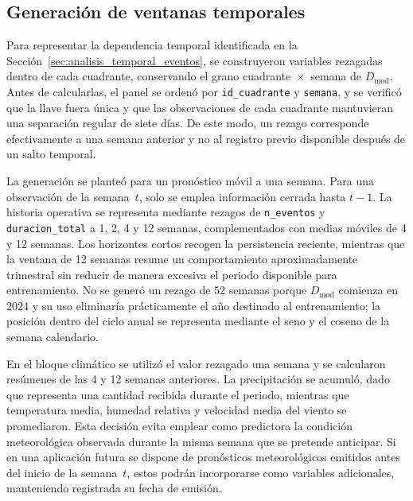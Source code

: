 \subsection{Generación de ventanas temporales}
\label{sec:generacion_ventanas_temporales}

Para representar la dependencia temporal identificada en la Sección~\ref{sec:analisis_temporal_eventos}, se construyeron variables rezagadas dentro de cada cuadrante, conservando el grano cuadrante~$\times$~semana de $D_{\mathrm{mod}}$. Antes de calcularlas, el panel se ordenó por \texttt{id\_cuadrante} y \texttt{semana}, y se verificó que la llave fuera única y que las observaciones de cada cuadrante mantuvieran una separación regular de siete días. De este modo, un rezago corresponde efectivamente a una semana anterior y no al registro previo disponible después de un salto temporal.

La generación se planteó para un pronóstico móvil a una semana. Para una observación de la semana~$t$, solo se emplea información cerrada hasta $t-1$. La historia operativa se representa mediante rezagos de \texttt{n\_eventos} y \texttt{duracion\_total} a 1, 2, 4 y 12 semanas, complementados con medias móviles de 4 y 12 semanas. Los horizontes cortos recogen la persistencia reciente, mientras que la ventana de 12 semanas resume un comportamiento aproximadamente trimestral sin reducir de manera excesiva el periodo disponible para entrenamiento. No se generó un rezago de 52 semanas porque $D_{\mathrm{mod}}$ comienza en 2024 y su uso eliminaría prácticamente el año destinado al entrenamiento; la posición dentro del ciclo anual se representa mediante el seno y el coseno de la semana calendario.

En el bloque climático se utilizó el valor rezagado una semana y se calcularon resúmenes de las 4 y 12 semanas anteriores. La precipitación se acumuló, dado que representa una cantidad recibida durante el periodo, mientras que temperatura media, humedad relativa y velocidad media del viento se promediaron. Esta decisión evita emplear como predictora la condición meteorológica observada durante la misma semana que se pretende anticipar. Si en una aplicación futura se dispone de pronósticos meteorológicos emitidos antes del inicio de la semana~$t$, estos podrán incorporarse como variables adicionales, manteniendo registrada su fecha de emisión.

